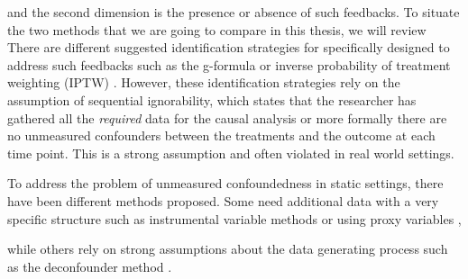  

and the second dimension is the presence or absence of such feedbacks.
To situate the two methods that we are going to compare in this thesis, we will review 
There are different suggested identification strategies for specifically designed to address such feedbacks such as the g-formula or inverse probability of treatment weighting (IPTW) \cite{robinsEstimationCausalEffects2008a}. 
However, these identification strategies rely on the assumption of 
sequential ignorability, which states that the researcher 
has gathered all the \emph{required} data for the causal analysis or more  
formally there are no unmeasured confounders between the treatments and the outcome at each time point. %
This is a strong assumption and often violated in real world settings. 

To address the problem of unmeasured confoundedness in static settings, there have been 
different methods proposed. Some need additional data with a very specific 
structure such as instrumental variable methods \cite{angristIdentificationLocalAverage1996} 
or using proxy variables \cite{tchetgenIntroductionProximalCausal2020}, 

while others rely on strong assumptions about the data generating process such as the deconfounder method \cite{wangBlessingsMultipleCauses2019}.